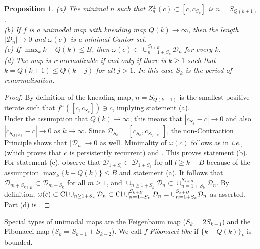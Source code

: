 \documentclass[12pt, psamsfonts, reqno]{amsart}
\newtheorem{proposition}[theorem]{Proposition}
\begin{document}
\begin{proposition}\label{prop:Qinfty}
(a) The minimal $n$ such that $Z^\pm_n(c) \subset [c, c_{S_k}]$
is $n = S_{Q(k+1)}$. \\
(b) If $f$ is a unimodal map with kneading map $Q(k) \to \infty$,
then the length $|{{\mathcal D}}_n| \to 0$ and $\omega(c)$ is a minimal Cantor set.
\\[1mm]
(c) If $\max_k k - Q(k) \leq B$, then
$\omega(c) \subset \cup_{n = 1+S_k}^{S_{k+B}} {{\mathcal D}}_n$ for every $k$. \\[1mm]
(d) The map is renormalizable if and only if there is $k \geq 1$ such
that $k = Q(k+1) \leq Q(k+j)$ for all $j > 1$. In this case $S_k$
is the period of renormalisation.
\end{proposition}

\begin{proof}
By definition of the kneading map, $n = S_{Q(k+1)}$ is the smallest positive iterate such that $f^n([c,c_{S_k}]) \owns c$, implying statement (a).
\\
Under the assumption that $Q(k) \to \infty$, this means that $|c_{S_k} - c| \to 0$
and also $|c_{S_{Q(k)}} - c| \to 0$ as $k \to \infty$.
Since ${{\mathcal D}}_{S_k} = [c_{S_k}, c_{S_{Q(k)}}]$, the non-Contraction Principle
shows that $|{{\mathcal D}}_n| \to 0$ as well. Minimality of $\omega(c)$ follows as in {{\em i.e., }}
\cite[Proposition 2]{Bknead} (which proves that $c$ is persistently recurrent) and \cite[Lemma 8]{Bknead}.
This proves statement (b).
\\
For statement (c), observe that ${{\mathcal D}}_{1+S_l} \subset {{\mathcal D}}_{1+S_k}$
for all $l \geq k+B$ because of the assumption $\max_k \{ k - Q(k) \} \leq B$
and statement (a).
It follows that ${{\mathcal D}}_{m + S_{k+B}} \subset {{\mathcal D}}_{m+S_k}$
for all $m \geq 1$, and $\cup_{n \geq 1+S_k} {{\mathcal D}}_n \subset \cup_{n = 1+S_k}^{S_{k+B}} {{\mathcal D}}_n$.
By definition, $\omega(c) \subset {\mathop{\rm Cl}\nolimits} \cup_{n \geq 1+S_k} {{\mathcal D}}_n \subset {\mathop{\rm Cl}\nolimits} \cup_{n = 1+S_k}^{S_{k+B}} {{\mathcal D}}_n
= \cup_{n = 1+S_k}^{S_{k+B}} {{\mathcal D}}_n$ as asserted.
\\
Part (d) is \cite[Proposition 1(iii)]{Bknead}.
\end{proof}

Special types of unimodal maps are the Feigenbaum map ($S_k =
2S_{k-1}$) and the Fibonacci map ($S_k = S_{k-1} + S_{k-2}$). We
call $f$ {\em Fibonacci-like} if $\{ k - Q(k)\}_k$ is bounded.
\end{document}
